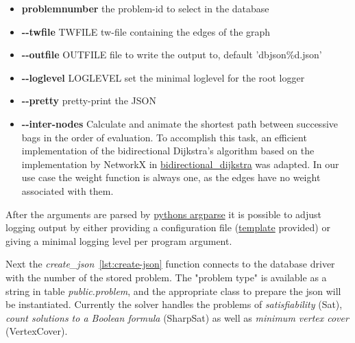 \documentclass[a4paper, 12pt, bibliography=totoc]{scrartcl}
\begin{document}
\begin{itemize}
	\item
	\textbf{problemnumber}
	 the problem-id to select in the database
	 
	\item
	\textbf{-{}-twfile }TWFILE
	tw-file containing the edges of the graph 
	
	\item
	\textbf{-{}-outfile }OUTFILE
	 file to write the output to, default 'dbjson\%d.json'
	 
	\item
	\textbf{-{}-loglevel }LOGLEVEL
	 set the minimal loglevel for the root logger
	 
	\item
	\textbf{-{}-pretty}
	 pretty-print the JSON
	 
	\item
	\textbf{-{}-inter-nodes}
	Calculate and animate the shortest path between successive bags in the order of evaluation. To accomplish this task, an efficient implementation of the bidirectional Dijkstra's algorithm \cite{shortestPathAlgo} based on the implementation by NetworkX \cite{SciPyProceedings_11} in \href{https://networkx.github.io/documentation/networkx-2.1/reference/algorithms/generated/networkx.algorithms.shortest_paths.weighted.bidirectional_dijkstra.html#networkx.algorithms.shortest_paths.weighted.bidirectional_dijkstra}{bidirectional\_dijkstra} was adapted.
	In our use case the weight function is always one, as the edges have no weight associated with them.
\end{itemize}
After the arguments are parsed by \href{https://docs.python.org/3/library/argparse.html}{pythons argparse} it is possible to adjust logging output by either providing a configuration file (\href{https://github.com/VaeterchenFrost/tdvisu/blob/master/tdvisu/logging.yml}{template} provided) or giving a minimal logging level per program argument.

Next the \textit{create\_json}~\ref{lst:create-json} function connects to the database driver with the number of the stored problem. 
The "problem type" is available as a string in table \emph{public.problem}, and the appropriate class to prepare the json will be instantiated. Currently the solver handles the problems of \textit{satisfiability} (Sat), \textit{count solutions to a Boolean formula} (SharpSat) as well as \textit{minimum vertex cover} (VertexCover).

\newpage
\end{document}
